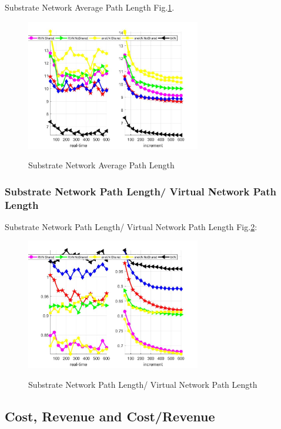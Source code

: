 Substrate Network Average Path Length Fig.\ref{fig:PathLengthAverageSubstrateNetwork}.
\begin{figure}
  \centering
  \includegraphics[width=3in]{Fig/PathLengthAverageSubstrateNetwork}\\
  \caption{ Substrate Network Average Path Length }\label{fig:PathLengthAverageSubstrateNetwork}
\end{figure}




\subsubsection{Substrate Network Path Length/ Virtual Network Path Length}


Substrate Network Path Length/ Virtual Network Path Length Fig.\ref{fig:PathLengthSubVir2VirNet}:
\begin{figure}
  \centering
  \includegraphics[width=3in]{Fig/PathLengthSubVir2VirNet}\\
  \caption{Substrate Network Path Length/ Virtual Network Path Length }\label{fig:PathLengthSubVir2VirNet}
\end{figure}



\subsection{Cost, Revenue and Cost/Revenue}
